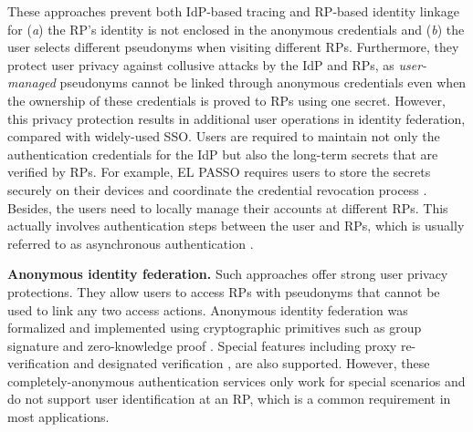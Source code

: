 These approaches prevent both IdP-based tracing and RP-based identity linkage for (\emph{a}) the RP's identity is not enclosed in the anonymous credentials and (\emph{b}) the user selects different pseudonyms when visiting different RPs.
Furthermore, they protect user privacy against collusive attacks by the IdP and RPs, as \emph{user-managed} pseudonyms cannot be linked through anonymous credentials \cite{anon-credential-2001, idemix, anon-credential} even when the ownership of these credentials is proved to RPs using one secret.
\newc
However, this privacy protection results in additional user operations in identity federation, compared with widely-used SSO.
Users are required to maintain not only the authentication credentials for the IdP but also the long-term secrets that are verified by RPs.
\oldc
For example, EL PASSO \cite{ELPASSO} requires users to store the secrets securely on their devices and coordinate the credential revocation process \cite{ELPASSO, UnlimitID}.
Besides, the users need to locally manage their accounts at different RPs. This actually involves authentication steps between the user and RPs, which is usually referred to as asynchronous authentication \cite{ELPASSO}.


\newc
\noindent\textbf{Anonymous identity federation.}
Such approaches offer strong user privacy protections. They allow users to access RPs with pseudonyms that cannot be used to link any two access actions.
\oldc
Anonymous identity federation was formalized \cite{WangWS13} and implemented using cryptographic primitives such as group signature and zero-knowledge proof \cite{WangWS13, HanCSTWW20, HanCSTW18}. Special features including proxy re-verification \cite{HanCSTWW20} and designated verification \cite{HanCSTW18}, are also supported. %
However, these completely-anonymous authentication services only work for special scenarios and do not support user identification at an RP, which is a common requirement in most applications.
